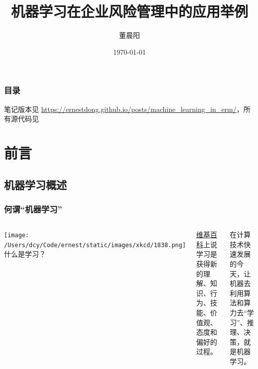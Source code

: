 \documentclass{ctexbeamer}
\author{董晨阳}
\date{\today}
\title{机器学习在企业风险管理中的应用举例}
\begin{document}
\maketitle
\begin{frame}
    \frametitle{目录}
    \tableofcontents[hideallsubsections]
    笔记版本见 \url{https://ernestdong.github.io/posts/machine_learning_in_erm/}，所有源代码见
\end{frame}

\section{前言}
\subsection{机器学习概述}
\begin{frame}
    \frametitle{何谓“机器学习”}
    \begin{columns}
        \texttt{[image: /Users/dcy/Code/ernest/static/images/xkcd/1838.png]}
        什么是学习？

        \href{https://zh.wikipedia.org/wiki/\%E5\%AD\%A6\%E4\%B9\%A0}{维基百科}上说学习是获得新的理解、知识、行为、技能、价值观、态度和偏好的过程。

        在计算技术快速发展的今天，让机器去利用算法和算力去“学习”、推理、决策，就是机器学习。
    \end{columns}
\end{frame}
\end{document}
